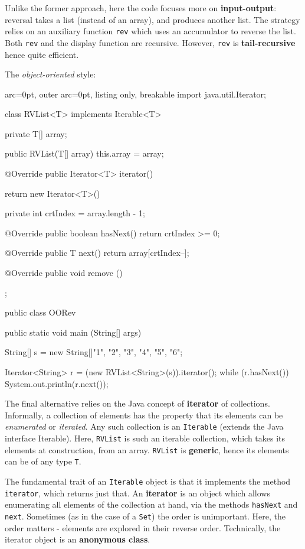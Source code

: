 Unlike the former approach, here the code focuses more on \textbf{input-output}: reversal takes a list (instead of an array), and produces another list. The strategy relies on an auxiliary function \texttt{rev} which uses an accumulator to reverse the list. Both \texttt{rev} and the display function are recursive. However, \texttt{rev} is \textbf{tail-recursive} hence quite efficient.

The \textit{object-oriented} style:

\begin{tcblisting}{ arc=0pt, outer arc=0pt, listing only, breakable}
import java.util.Iterator;

class RVList<T> implements Iterable<T> {
	private T[] array;

	public RVList(T[] array){
		this.array = array;
	}

	@Override
	public Iterator<T> iterator() {
		return new Iterator<T>(){
			private int crtIndex = array.length - 1;

			@Override
			public boolean hasNext(){
				return crtIndex >= 0;
			}

			@Override
			public T next(){
				return array[crtIndex--];
			} 

			@Override
			public void remove () {}
		};
	}
}

public class OORev {

	public static void main (String[] args) {
		String[] s = new String[]{"1", "2", "3", "4", "5", "6"};
		
		Iterator<String> r = (new RVList<String>(s)).iterator();
		while (r.hasNext()){
			System.out.println(r.next());
		}
	}
}

\end{tcblisting}


The final alternative relies on the Java concept of \textbf{iterator} of collections. Informally, a collection of elements has the property that its elements can be \textit{enumerated} or \textit{iterated}. Any such collection is an \texttt{Iterable} (extends the Java interface Iterable). Here, \texttt{RVList} is such an iterable collection, which takes its elements at construction, from an array. \texttt{RVList} is \textbf{generic}, hence its elements can be of any type \texttt{T}. 

The fundamental trait of an \texttt{Iterable} object is that it implements the method \texttt{iterator}, which returns just that. An \textbf{iterator} is an object which allows enumerating all elements of the collection at hand, via the methods \texttt{hasNext} and \texttt{next}. Sometimes (as in the case of a \texttt{Set}) the order is unimportant. Here, the order matters - elements are explored in their reverse order. Technically, the iterator object is an \textbf{anonymous class}.

